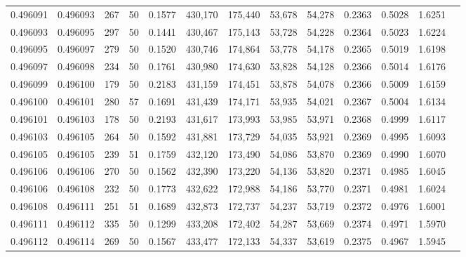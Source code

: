 \begin{tabular}{rrrrrrrrrrrrr}
0.496091 & 0.496093 &   267 &  50 &                                     0.1577 & 430,170 & 175,440 &  53,678 &  54,278 & 0.2363 & 0.5028 & 1.6251 \\
0.496093 & 0.496095 &   297 &  50 &                                     0.1441 & 430,467 & 175,143 &  53,728 &  54,228 & 0.2364 & 0.5023 & 1.6224 \\
0.496095 & 0.496097 &   279 &  50 &                                     0.1520 & 430,746 & 174,864 &  53,778 &  54,178 & 0.2365 & 0.5019 & 1.6198 \\
0.496097 & 0.496098 &   234 &  50 &                                     0.1761 & 430,980 & 174,630 &  53,828 &  54,128 & 0.2366 & 0.5014 & 1.6176 \\
0.496099 & 0.496100 &   179 &  50 &                                     0.2183 & 431,159 & 174,451 &  53,878 &  54,078 & 0.2366 & 0.5009 & 1.6159 \\
0.496100 & 0.496101 &   280 &  57 &                                     0.1691 & 431,439 & 174,171 &  53,935 &  54,021 & 0.2367 & 0.5004 & 1.6134 \\
0.496101 & 0.496103 &   178 &  50 &                                     0.2193 & 431,617 & 173,993 &  53,985 &  53,971 & 0.2368 & 0.4999 & 1.6117 \\
0.496103 & 0.496105 &   264 &  50 &                                     0.1592 & 431,881 & 173,729 &  54,035 &  53,921 & 0.2369 & 0.4995 & 1.6093 \\
0.496105 & 0.496105 &   239 &  51 &                                     0.1759 & 432,120 & 173,490 &  54,086 &  53,870 & 0.2369 & 0.4990 & 1.6070 \\
0.496106 & 0.496106 &   270 &  50 &                                     0.1562 & 432,390 & 173,220 &  54,136 &  53,820 & 0.2371 & 0.4985 & 1.6045 \\
0.496106 & 0.496108 &   232 &  50 &                                     0.1773 & 432,622 & 172,988 &  54,186 &  53,770 & 0.2371 & 0.4981 & 1.6024 \\
0.496108 & 0.496111 &   251 &  51 &                                     0.1689 & 432,873 & 172,737 &  54,237 &  53,719 & 0.2372 & 0.4976 & 1.6001 \\
0.496111 & 0.496112 &   335 &  50 &                                     0.1299 & 433,208 & 172,402 &  54,287 &  53,669 & 0.2374 & 0.4971 & 1.5970 \\
0.496112 & 0.496114 &   269 &  50 &                                     0.1567 & 433,477 & 172,133 &  54,337 &  53,619 & 0.2375 & 0.4967 & 1.5945 \\

\end{tabular}
